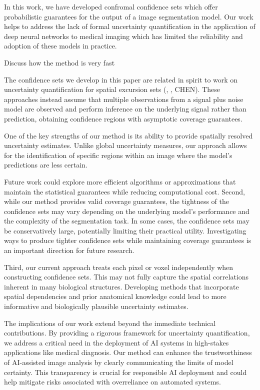 In this work, we have developed confromal confidence sets which offer probabilistic guarantees for the output of a image segmentation model. Our work helps to address the lack of formal uncertainty quantification in the application of deep neural networks to medical imaging which has limited the reliability and adoption of these models in practice.

Discuss how the method is very fast

The confidence sets we develop in this paper are related in spirit to work on uncertainty quantification for spatial excursion sets (\cite{Bowring2019}, \cite{Mejia2019}, CHEN). These approaches instead assume that multiple observations from a signal plus noise model are observed and perform inference on the underlying signal rather than prediction, obtaining confidence regions with asymptotic coverage guarantees. 

One of the key strengths of our method is its ability to provide spatially resolved uncertainty estimates. Unlike global uncertainty measures, our approach allows for the identification of specific regions within an image where the model's predictions are less certain. 

Future work could explore more efficient algorithms or approximations that maintain the statistical guarantees while reducing computational cost.
Second, while our method provides valid coverage guarantees, the tightness of the confidence sets may vary depending on the underlying model's performance and the complexity of the segmentation task. In some cases, the confidence sets may be conservatively large, potentially limiting their practical utility. Investigating ways to produce tighter confidence sets while maintaining coverage guarantees is an important direction for future research.

Third, our current approach treats each pixel or voxel independently when constructing confidence sets. This may not fully capture the spatial correlations inherent in many biological structures. Developing methods that incorporate spatial dependencies and prior anatomical knowledge could lead to more informative and biologically plausible uncertainty estimates.

The implications of our work extend beyond the immediate technical contributions. By providing a rigorous framework for uncertainty quantification, we address a critical need in the deployment of AI systems in high-stakes applications like medical diagnosis. Our method can enhance the trustworthiness of AI-assisted image analysis by clearly communicating the limits of model certainty. This transparency is crucial for responsible AI deployment and could help mitigate risks associated with overreliance on automated systems.

